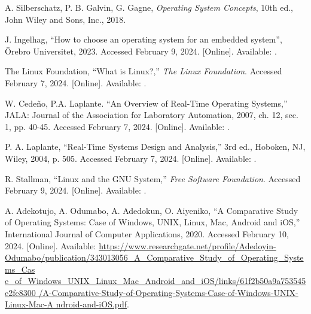 \markboth{}{}

\begin{thebibliography}{99}

    \markboth{}{}

        A. Silberschatz, P. B. Galvin, G. Gagne,
        \textit{Operating System Concepts}, 10th ed.,
        John Wiley and Sons, Inc., 2018.

        J. Ingelhag,
        ``How to choose an operating system for an embedded system'',
        \"Orebro Universitet, 2023.
        Accessed February 9, 2024.
        [Online].
        Available: .

        The Linux Foundation,
        ``What is Linux?,''
        \textit{The Linux Foundation}.
        Accessed February 7, 2024.
        [Online].
        Available: .

        W. Cede\~no, P.A. Laplante.
        ``An Overview of Real-Time Operating Systems,''
        JALA: Journal of the Association for Laboratory Automation, 2007, ch. 12, sec. 1, pp. 40-45.
        Accessed February 7, 2024.
        [Online].
        Available: .

        P. A. Laplante,
        ``Real-Time Systems Design and Analysis,'' 3rd ed.,
        Hoboken, NJ, Wiley, 2004, p. 505.
        Accessed February 7, 2024.
        [Online].
        Available: .

        R. Stallman,
        ``Linux and the GNU System,''
        \textit{Free Software Foundation}.
        Accessed February 9, 2024.
        [Online].
        Available: .

        A. Adekotujo, A. Odumabo, A. Adedokun, O. Aiyeniko,
        ``A Comparative Study of Operating Systems: Case of Windows, UNIX, Linux, Mac, Android and iOS,''
        International Journal of Computer Applications, 2020.
        Accessed February 10, 2024.
        [Online].
        Available: \href{https://www.researchgate.net/profile/Adedoyin-Odumabo/publication/343013056\_A\_Comparative\_Study\_of\_Operating\_Systems\_Case\_of\_Windows\_UNIX\_Linux\_Mac\_Android\_and\_iOS/links/61f2b50a9a753545e2fe8300/A-Comparative-Study-of-Operating-Systems-Case-of-Windows-UNIX-Linux-Mac-Android-and-iOS.pdf}{https://www.researchgate.net/profile/Adedoyin-Odumabo/publication/343013056\_A\_Comparative\_Study\_of\_Operating\_Systems\_Cas e\_of\_Windows\_UNIX\_Linux\_Mac\_Android\_and\_iOS/links/61f2b50a9a753545e2fe8300 /A-Comparative-Study-of-Operating-Systems-Case-of-Windows-UNIX-Linux-Mac-A ndroid-and-iOS.pdf}.


\end{thebibliography}
